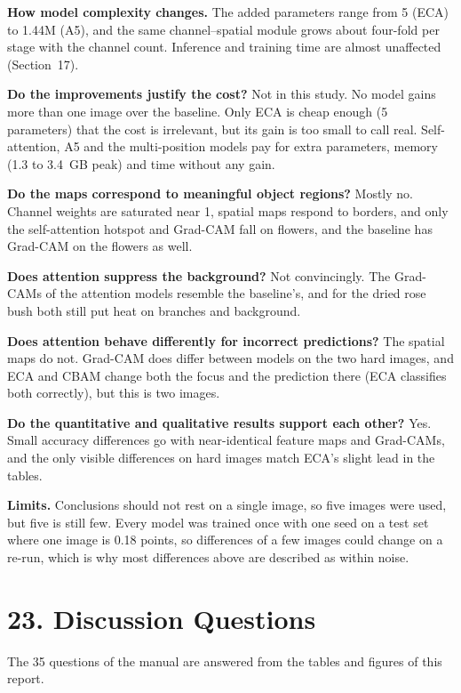 \documentclass[11pt]{article}
\begin{document}
\textbf{How model complexity changes.} The added parameters range from 5
(ECA) to 1.44M (A5), and the same channel--spatial module grows about
four-fold per stage with the channel count. Inference and training time are
almost unaffected (Section~17).

\textbf{Do the improvements justify the cost?} Not in this study. No model
gains more than one image over the baseline. Only ECA is cheap enough
(5 parameters) that the cost is irrelevant, but its gain is too small to
call real. Self-attention, A5 and the multi-position models pay for extra
parameters, memory (1.3 to 3.4~GB peak) and time without any gain.

\textbf{Do the maps correspond to meaningful object regions?} Mostly no.
Channel weights are saturated near 1, spatial maps respond to borders, and
only the self-attention hotspot and Grad-CAM fall on flowers, and the
baseline has Grad-CAM on the flowers as well.

\textbf{Does attention suppress the background?} Not convincingly. The
Grad-CAMs of the attention models resemble the baseline's, and for the dried
rose bush both still put heat on branches and background.

\textbf{Does attention behave differently for incorrect predictions?} The
spatial maps do not. Grad-CAM does differ between models on the two hard
images, and ECA and CBAM change both the focus and the prediction there
(ECA classifies both correctly), but this is two images.

\textbf{Do the quantitative and qualitative results support each other?}
Yes. Small accuracy differences go with near-identical feature maps and
Grad-CAMs, and the only visible differences on hard images match ECA's
slight lead in the tables.

\textbf{Limits.} Conclusions should not rest on a single image, so five
images were used, but five is still few. Every model was trained once with
one seed on a test set where one image is 0.18 points, so differences of a
few images could change on a re-run, which is why most differences above
are described as within noise.

\section*{23. Discussion Questions}

The 35 questions of the manual are answered from the tables and figures of
this report.
\end{document}
